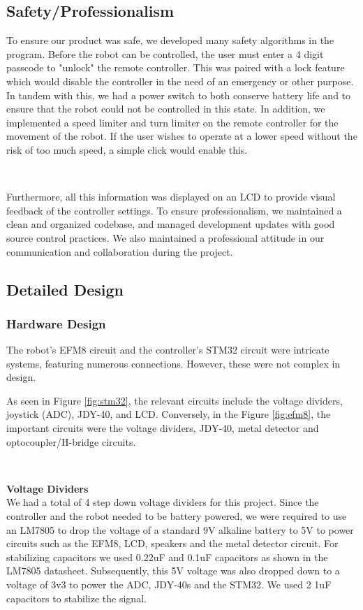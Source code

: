 \documentclass{article}
\begin{document}
\subsection{Safety/Professionalism}

To ensure our product was safe, we developed many safety algorithms in the program. Before the robot can be controlled, the user must enter a 4 digit passcode
to "unlock" the remote controller. This was paired with a lock feature which would disable the controller in the need of an emergency or other purpose. In tandem with this,
we had a power switch to both conserve battery life and to ensure that the robot could not be controlled in this state. In addition, we implemented a speed limiter and turn
limiter on the remote controller for the movement of the robot. If the user wishes to operate at a lower speed without the risk of too much speed, a simple click would enable this.

\

Furthermore, all this information was displayed on an LCD to provide visual feedback of the controller settings.
To ensure professionalism, we maintained a clean and organized codebase, and managed development updates with good source control practices. We also maintained a professional
attitude in our communication and collaboration during the project.

\subsection{Detailed Design}

\subsubsection{Hardware Design}
The robot's EFM8 circuit and the controller's STM32 circuit were intricate systems, featuring numerous connections. However, these were not complex in design.

As seen in Figure \ref{fig:stm32}, the relevant circuits
include the voltage dividers, joystick (ADC), JDY-40, and LCD. Conversely, in the Figure \ref{fig:efm8}, the important circuits
were the voltage dividers, JDY-40, metal detector and optocoupler/H-bridge circuits.

\

\textbf{Voltage Dividers} \\
We had a total of 4 step down voltage dividers for this project. Since the controller and the robot needed to be battery powered, we were required to use an LM7805 to drop the voltage of a standard 9V alkaline battery to 5V to power circuits such as the EFM8, LCD, speakers and the metal detector circuit. For stabilizing capacitors we used 0.22uF and 0.1uF capacitors as shown in the LM7805 datasheet. Subsequently, this 5V voltage was also dropped down to a voltage of 3v3 to power the ADC, JDY-40s and the STM32. We used 2 1uF capacitors to stabilize the signal.
\end{document}

